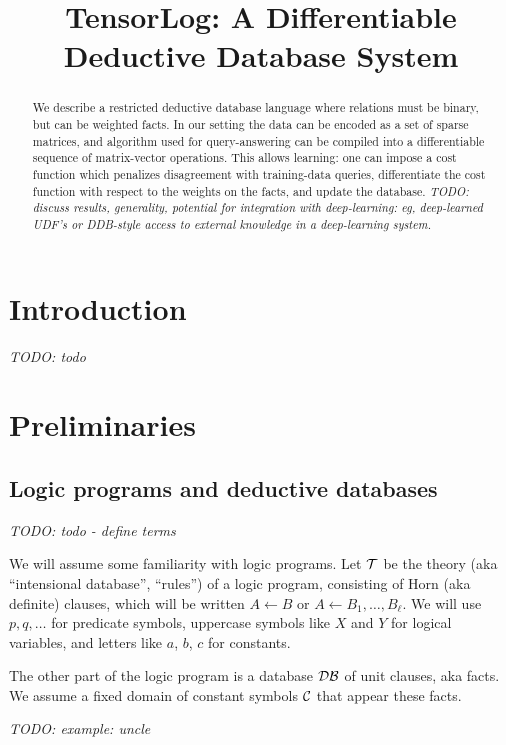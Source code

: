 \documentclass[12pt]{article}
\title{TensorLog: A Differentiable \\
Deductive Database System}
\newcommand{\yy}[1]{\textit{TODO: {#1}}}
\begin{document}
 

\maketitle

\begin{abstract}
We describe a restricted deductive database language where relations
must be binary, but can be weighted facts.  In our setting the data
can be encoded as a set of sparse matrices, and algorithm used for
query-answering can be compiled into a differentiable sequence of
matrix-vector operations.  This allows learning: one can impose a cost
function which penalizes disagreement with training-data queries,
differentiate the cost function with respect to the weights on the
facts, and update the database.  \yy{discuss results, generality,
  potential for integration with deep-learning: eg, deep-learned UDF's
  or DDB-style access to external knowledge in a deep-learning
  system.}
\end{abstract}


\section{Introduction}

\yy{todo}

\section{Preliminaries}

\subsection{Logic programs and deductive databases}

\yy{todo - define terms}

We will assume some familiarity with logic programs.  Let ${\cal T}$
be the theory (aka ``intensional database'', ``rules'') of a logic
program, consisting of Horn (aka definite) clauses, which will be
written $A\leftarrow{}B$ or $A\leftarrow{}B_1,\ldots,B_\ell$.  We will
use $p,q,\ldots$ for predicate symbols, uppercase symbols like $X$ and
$Y$ for logical variables, and letters like $a$, $b$, $c$ for
constants.

The other part of the logic program is a database ${\cal DB}$ of unit
clauses, aka facts.  We assume a fixed domain of constant symbols
${\cal C}$ that appear these facts.

\yy{example: uncle}
\end{document}

